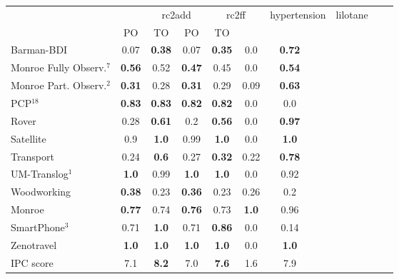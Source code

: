 \begin{tabular}{lccccccccccl} 
\toprule 
  && \multicolumn{2}{c}{rc2add} & \multicolumn{2}{c}{rc2ff} & \multicolumn{2}{c}{hypertension} & \multicolumn{2}{c}{lilotane} \\ 
\cmidrule(lr){3-4} \cmidrule(lr){5-6} \cmidrule(lr){7-8} \cmidrule(lr){9-10}  
 &PO & TO & PO & TO  \\ 
\midrule 
Barman-BDI & 0.07 & \textbf{0.38} & 0.07 & \textbf{0.35} & 0.0 & \textbf{0.72}  \\ 
Monroe Fully Observ.$^{7}$ & \textbf{0.56} & 0.52 & \textbf{0.47} & 0.45 & 0.0 & \textbf{0.54}  \\ 
Monroe Part. Observ.$^{2}$ & \textbf{0.31} & 0.28 & \textbf{0.31} & 0.29 & 0.09 & \textbf{0.63}  \\ 
PCP$^{18}$ & \textbf{0.83} & \textbf{0.83} & \textbf{0.82} & \textbf{0.82} & 0.0 & 0.0  \\ 
Rover & 0.28 & \textbf{0.61} & 0.2 & \textbf{0.56} & 0.0 & \textbf{0.97}  \\ 
Satellite & 0.9 & \textbf{1.0} & 0.99 & \textbf{1.0} & 0.0 & \textbf{1.0}  \\ 
Transport & 0.24 & \textbf{0.6} & 0.27 & \textbf{0.32} & 0.22 & \textbf{0.78}  \\ 
UM-Translog$^{1}$ & \textbf{1.0} & 0.99 & \textbf{1.0} & \textbf{1.0} & 0.0 & 0.92  \\ 
Woodworking & \textbf{0.38} & 0.23 & \textbf{0.36} & 0.23 & 0.26 & 0.2  \\ 
\midrule 
 Monroe & \textbf{0.77} & 0.74 & \textbf{0.76} & 0.73 & \textbf{1.0} & 0.96  \\ 
SmartPhone$^{3}$ & 0.71 & \textbf{1.0} & 0.71 & \textbf{0.86} & 0.0 & 0.14  \\ 
Zenotravel & \textbf{1.0} & \textbf{1.0} & \textbf{1.0} & \textbf{1.0} & 0.0 & \textbf{1.0}  \\ 
\midrule 
 IPC score & 7.1 & \textbf{8.2} & 7.0 & \textbf{7.6} & 1.6 & 7.9  \\ 
\bottomrule 
 \end{tabular} 
